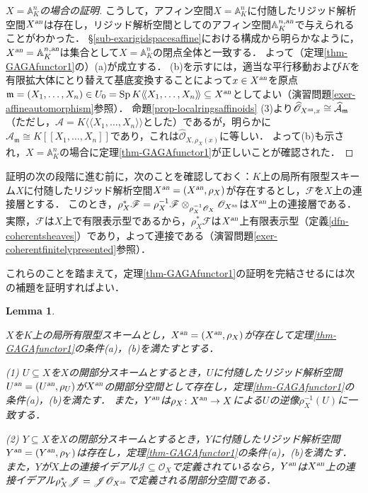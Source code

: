 \documentclass[a4paper,12pt, dvipdfmx]{jsbook}
\def\A{\mathbb{A}}
\def\O{\mathscr{O}}
\def\m{\mathfrak{m}}
\def\Sp{\mathop{\mathrm{Sp}}\nolimits}
\def\an{\textsl{an}}
\def\dl{\langle\!\langle}
\def\dr{\rangle\!\rangle}
\theoremstyle{plain}
\newtheorem{lem}[thm]{\bfseries Lemma}
\theoremstyle{definition}
\begin{document}
\begin{proof}[{\rm $X=\A^n_K$の場合の証明}]
こうして，アフィン空間$X=\A^n_K$に付随したリジッド解析空間$X^{\an}$は存在し，リジッド解析空間としてのアフィン空間$\A^{n,\an}_K$で与えられることがわかった．
\S\ref{sub-exarigidspacesaffine}における構成から明らかなように，$X^{\an}=\A^{n,\an}_K$は集合として$X=\A^n_K$の閉点全体と一致する．
よって（定理\ref{thm-GAGAfunctor1}の）(a)が成立する．
(b)を示すには，適当な平行移動および$K$を有限拡大体にとり替えて基底変換することによって$x\in X^{\an}$を原点$\m=(X_1,\ldots,X_n)\in U_0=\Sp K\dl X_1,\ldots,X_n\dr\subseteq X^{\an}$としてよい（演習問題\ref{exer-affineautomorphism}参照）．
命題\ref{prop-localringsaffinoids} (3)より$\widehat{\O}_{X^{\an},x}\cong\widehat{\mathcal{A}}_{\m}$（ただし，$\mathcal{A}=K\dl X_1,\ldots,X_n\dr$とした）であるが，明らかに$\widehat{\mathcal{A}}_{\m}\cong K[\![X_1,\ldots,X_n]\!]$であり，これは$\widehat{\O}_{X,\rho_X(x)}$に等しい．
よって(b)も示され，$X=\A^n_K$の場合に定理\ref{thm-GAGAfunctor1}が正しいことが確認された．
\end{proof}

証明の次の段階に進む前に，次のことを確認しておく：$K$上の局所有限型スキーム$X$に付随したリジッド解析空間$X^{\an}=(X^{\an},\rho_X)$が存在するとし，$\mathscr{F}$を$X$上の連接層とする．
このとき，$\rho^{\ast}_X\mathscr{F}=\rho^{-1}_X\mathscr{F}\otimes_{\rho^{-1}_X\O_X}\O_{X^{\an}}$は$X^{\an}$上の連接層である．
実際，$\mathscr{F}$は$X$上で有限表示型であるから，$\rho^{\ast}_X\mathscr{F}$は$X^{\an}$上有限表示型（定義\ref{dfn-coherentsheaves}）であり，よって連接である（演習問題\ref{exer-coherentfinitelypresented}参照）．

これらのことを踏まえて，定理\ref{thm-GAGAfunctor1}の証明を完結させるには次の補題を証明すればよい．
\begin{lem}\label{lem-GAGAfunctor3}{\rm 
$X$を$K$上の局所有限型スキームとし，$X^{\an}=(X^{\an},\rho_X)$が存在して定理\ref{thm-GAGAfunctor1}の条件(a)，(b)を満たすとする．

{\rm (1)} $U\subseteq X$を$X$の開部分スキームとするとき，$U$に付随したリジッド解析空間$U^{\an}=(U^{\an},\rho_U)$が$X^{\an}$の開部分空間として存在し，定理\ref{thm-GAGAfunctor1}の条件(a)，(b)を満たす．
また，$Y^{\an}$は$\rho_X\colon X^{\an}\rightarrow X$による$U$の逆像$\rho^{-1}_X(U)$に一致する．

{\rm (2)} $Y\subseteq X$を$X$の閉部分スキームとするとき，$Y$に付随したリジッド解析空間$Y^{\an}=(Y^{\an},\rho_Y)$は存在し，定理\ref{thm-GAGAfunctor1}の条件(a)，(b)を満たす．
また，$Y$が$X$上の連接イデアル$\mathscr{J}\subseteq\O_X$で定義されているなら，$Y^{\an}$は$X^{\an}$上の連接イデアル$\rho^{\ast}_X\mathscr{J}=\mathscr{J}\O_{X^{\an}}$で定義される閉部分空間である．}
\end{lem}
\end{document}
